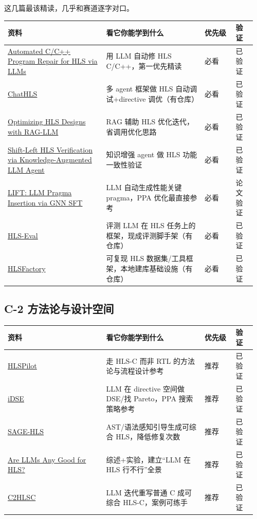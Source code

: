 \documentclass[12pt,a4paper]{ctexbook}
\begin{document}
这几篇最该精读，几乎和赛道逐字对口。

{\small
\begin{longtable}{@{}L{0.38\linewidth}L{0.38\linewidth}L{0.12\linewidth}L{0.08\linewidth}@{}}
\toprule
\textbf{资料} & \textbf{看它你能学到什么} & \textbf{优先级} & \textbf{验证} \\
\midrule
\endhead
\href{https://arxiv.org/abs/2407.03889}{Automated C/C++ Program Repair for HLS via LLMs} & 用 LLM 自动修 HLS C/C++，第一优先精读 & 必看 & 已验证 \\
\href{https://arxiv.org/abs/2507.00642}{ChatHLS} & 多 agent 框架做 HLS 自动调试+directive 调优（有仓库） & 必看 & 已验证 \\
\href{https://arxiv.org/abs/2410.07356}{Optimizing HLS Designs with RAG-LLM} & RAG 辅助 HLS 优化迭代，省调用优化思路 & 必看 & 已验证 \\
\href{https://arxiv.org/abs/2606.17128}{Shift-Left HLS Verification via Knowledge-Augmented LLM Agent} & 知识增强 agent 做 HLS 功能一致性验证 & 必看 & 已验证 \\
\href{https://arxiv.org/abs/2504.21187}{LIFT: LLM Pragma Insertion via GNN SFT} & LLM 自动生成性能关键 pragma，PPA 优化最直接参考 & 必看 & 论文验证 \\
\href{https://arxiv.org/abs/2504.12268}{HLS-Eval} & 评测 LLM 在 HLS 任务上的框架，现成评测脚手架（有仓库） & 必看 & 已验证 \\
\href{https://arxiv.org/abs/2405.00820}{HLSFactory} & 可复现 HLS 数据集/工具框架，本地建库基础设施（有仓库） & 必看 & 已验证 \\
\bottomrule
\end{longtable}
}

\subsection*{C-2  方法论与设计空间}

{\small
\begin{longtable}{@{}L{0.38\linewidth}L{0.38\linewidth}L{0.12\linewidth}L{0.08\linewidth}@{}}
\toprule
\textbf{资料} & \textbf{看它你能学到什么} & \textbf{优先级} & \textbf{验证} \\
\midrule
\endhead
\href{https://arxiv.org/abs/2408.06810}{HLSPilot} & 走 HLS-C 而非 RTL 的方法论与流程设计参考 & 推荐 & 已验证 \\
\href{https://arxiv.org/abs/2505.22086}{iDSE} & LLM 在 directive 空间做 DSE/找 Pareto，PPA 搜索策略参考 & 推荐 & 已验证 \\
\href{https://arxiv.org/abs/2508.03558}{SAGE-HLS} & AST/语法感知引导生成可综合 HLS，降低修复次数 & 推荐 & 已验证 \\
\href{https://arxiv.org/abs/2408.10428}{Are LLMs Any Good for HLS?} & 综述+实验，建立“LLM 在 HLS 行不行”全景 & 推荐 & 已验证 \\
\href{https://arxiv.org/abs/2406.09233}{C2HLSC} & LLM 迭代重写普通 C 成可综合 HLS-C，案例可练手 & 推荐 & 已验证 \\
\bottomrule
\end{longtable}
}
\end{document}
